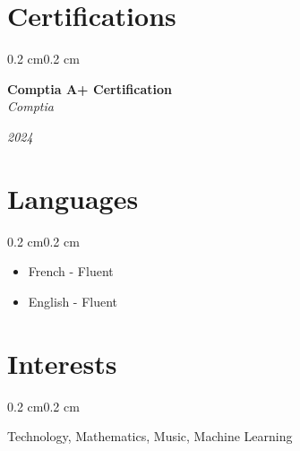 \documentclass[10pt, letterpaper]{article}
\newenvironment{highlights}{%
    \begin{itemize}[
        topsep=0.10 cm,%
        parsep=0.10 cm,%
        partopsep=0pt,%
        itemsep=0pt,%
        leftmargin=0.4 cm + 10pt%
    ]
}{%
    \end{itemize}%
}
\newenvironment{onecolentry}{%
    \begin{adjustwidth}{0.2 cm}{0.2 cm}%
}{%
    \end{adjustwidth}%
}
\newenvironment{twocolentry}[1]{%
    \begin{onecolentry}%
    \def\twocolentryarg{#1}%
    \noindent
    \begin{minipage}[t]{0.68\textwidth} %
}{%
    \end{minipage}\hfill%
    \begin{minipage}[t]{0.30\textwidth} %
      \raggedleft\twocolentryarg
    \end{minipage}%
    \vspace{0.2cm}%
    \end{onecolentry}%
}
\begin{document}
\section{Certifications}
\begin{twocolentry}{\textit{2024}}
    \textbf{Comptia A+ Certification }\\
    \textit{Comptia }
\end{twocolentry}
\vspace{0.10 cm}

\section{Languages}
\begin{onecolentry}
    \begin{highlights}
        \item French - Fluent
        \item English - Fluent
    \end{highlights}
\end{onecolentry}

\section{Interests}
\begin{onecolentry}
    Technology, Mathematics, Music, Machine Learning
\end{onecolentry}
\end{document}
